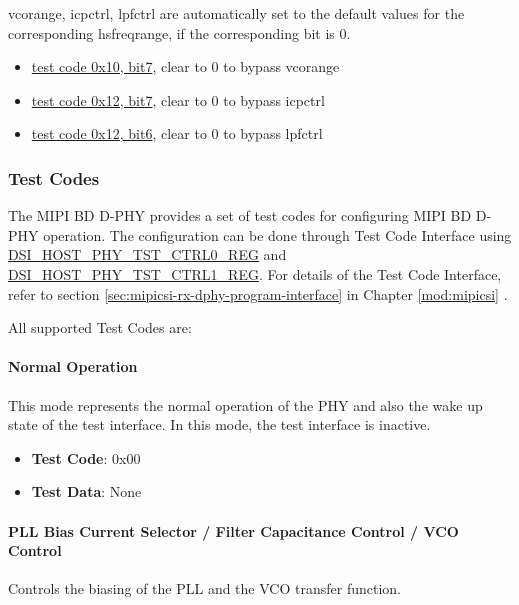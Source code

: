 \documentclass[main\_\_EN.tex]{subfiles}
\begin{document}
\begin{tiplisting}
    vcorange, icpctrl, lpfctrl are automatically set to the default values for the corresponding hsfreqrange, if the corresponding bit is 0.\\
    \begin{itemize}
        \item \hyperref[sec:test-code-0x10]{test code 0x10, bit7}, clear to 0 to bypass vcorange
        \item \hyperref[sec:test-code-0x12]{test code 0x12, bit7}, clear to 0 to bypass icpctrl
        \item \hyperref[sec:test-code-0x12]{test code 0x12, bit6}, clear to 0 to bypass lpfctrl
    \end{itemize}
\end{tiplisting}

\subsubsection{Test Codes}
The MIPI BD D-PHY provides a set of test codes for configuring MIPI BD D-PHY operation. The configuration can be done through Test Code Interface using \hyperref[regdesc:DSIHOSTPHYTSTCTRL0REG]{DSI\_HOST\_PHY\_TST\_CTRL0\_REG} and \hyperref[regdesc:DSIHOSTPHYTSTCTRL1REG]{DSI\_HOST\_PHY\_TST\_CTRL1\_REG}. For details of the Test Code Interface, refer to section \ref{sec:mipicsi-rx-dphy-program-interface} in Chapter \ref{mod:mipicsi} \textit{}.

All supported Test Codes are:

\paragraph{Normal Operation}
\label{sec:normal-operation}
This mode represents the normal operation of the PHY and also the wake up state of the test interface. In this mode, the test interface is inactive.

\begin{itemize}
    \item \textbf{Test Code}: 0x00
    \item \textbf{Test Data}: None
\end{itemize}

\paragraph{PLL Bias Current Selector / Filter Capacitance Control / VCO Control}
\label{sec:test-code-0x10}
Controls the biasing of the PLL and the VCO transfer function.
\end{document}

